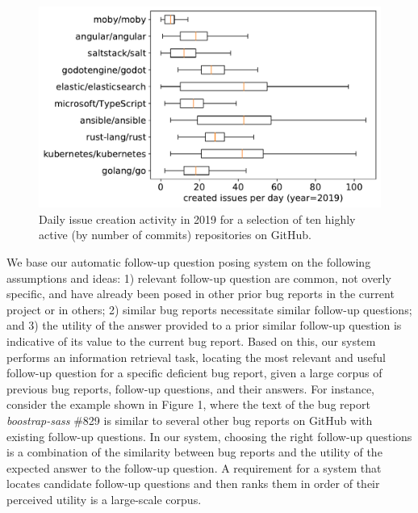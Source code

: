 \begin{figure}[t]
\centering
\includegraphics[width=0.95\linewidth]{figures/popular_repos.pdf}
\caption{Daily issue creation activity in 2019 for a selection of ten highly active
(by number of commits) repositories on GitHub.}
\label{fig:repo_activity}
\end{figure}

%
We base our automatic follow-up question posing system on the following assumptions and ideas: 1) relevant follow-up question are common, not overly specific, and have already been posed in other prior bug reports in the current project or in others; 2) similar bug reports necessitate similar follow-up questions; and 3) the utility of the answer provided to a prior similar follow-up question is indicative of its value to the current bug report.
%
Based on this, our system performs an information retrieval task, locating the most relevant and useful follow-up question for a specific deficient bug report, given a large corpus of previous bug reports, follow-up questions, and their answers.
%
For instance, consider the example shown in Figure 1, where the text of the bug report {\em boostrap-sass} \#829 is similar to several other bug reports on GitHub with existing follow-up questions.
%
In our system, choosing the right follow-up questions is a combination of the similarity between bug reports and the utility of the expected answer to the follow-up question.
%
A requirement for a system that locates candidate follow-up questions and then ranks them in order of their perceived utility is a large-scale corpus.


